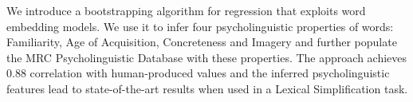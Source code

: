We introduce a bootstrapping algorithm for regression that exploits word embedding models. We use it to infer four psycholinguistic properties of words: Familiarity, Age of Acquisition, Concreteness and Imagery and further populate the MRC Psycholinguistic Database with these properties. The approach achieves 0.88 correlation with human-produced values and the inferred psycholinguistic features lead to state-of-the-art results when used in a Lexical Simplification task.
